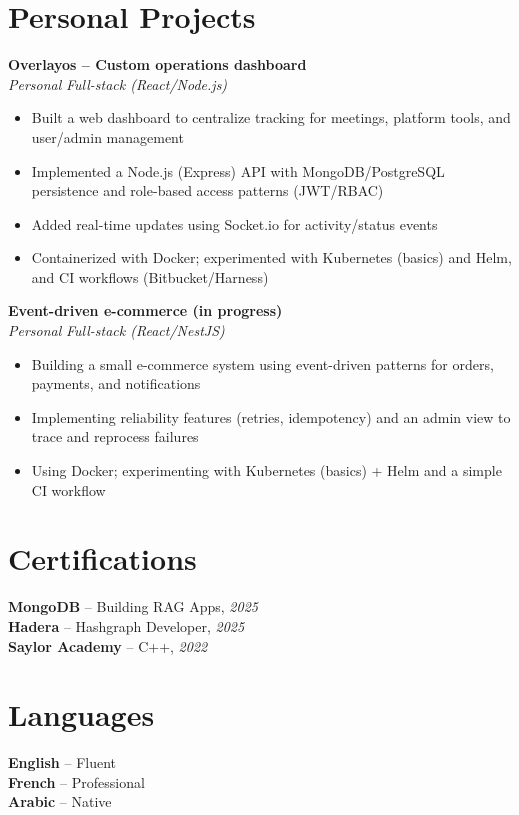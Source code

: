 \documentclass[10pt,a4paper]{article}
\begin{document}
\vspace{4pt}
\section*{Personal Projects}
{\small
\textbf{Overlayos -- Custom operations dashboard}\\[1pt]
\textit{Personal} \hfill \textit{Full-stack (React/Node.js)}
\begin{itemize}
  \item Built a web dashboard to centralize tracking for meetings, platform tools, and user/admin management
  \item Implemented a Node.js (Express) API with MongoDB/PostgreSQL persistence and role-based access patterns (JWT/RBAC)
  \item Added real-time updates using Socket.io for activity/status events
  \item Containerized with Docker; experimented with Kubernetes (basics) and Helm, and CI workflows (Bitbucket/Harness)
\end{itemize}

\vspace{2pt}
\textbf{Event-driven e-commerce (in progress)}\\[1pt]
\textit{Personal} \hfill \textit{Full-stack (React/NestJS)}
\begin{itemize}
  \item Building a small e-commerce system using event-driven patterns for orders, payments, and notifications
  \item Implementing reliability features (retries, idempotency) and an admin view to trace and reprocess failures
  \item Using Docker; experimenting with Kubernetes (basics) + Helm and a simple CI workflow
\end{itemize}
}

\vspace{3pt}
\section*{Certifications}
{\small
\textbf{MongoDB} -- Building RAG Apps, \textit{2025}\\[1pt]
\textbf{Hadera} -- Hashgraph Developer, \textit{2025}\\[1pt]
\textbf{Saylor Academy} -- C++, \textit{2022}
}

\section*{Languages}
{\small
\textbf{English} -- Fluent\\[1pt]
\textbf{French} -- Professional\\[1pt]
\textbf{Arabic} -- Native
}
\end{document}
